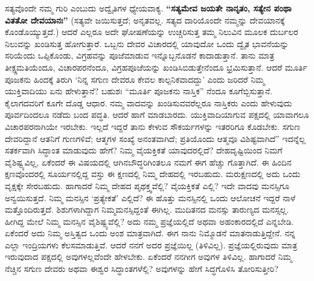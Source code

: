 ಸತ್ಯವೊಂದೇ ನಮ್ಮ ಗುರಿ ಎಂಬುದು ಅದ್ವೈತಿಗಳ ಧ್ಯೇಯವಾಕ್ಯ. \textbf{“ಸತ್ಯಮೇವ ಜಯತೇ ನಾನೃತಂ, ಸತ್ಯೇನ ಪಂಥಾ ವಿತತೋ ದೇವಯಾನಃ”} (ಸತ್ಯವೇ ಜಯಿಸುತ್ತದೆ; ಅನೃತವಲ್ಲ. ಸತ್ಯದ ದಾರಿಯೊಂದೇ ನಮ್ಮನ್ನು ದೇವಯಾನಕ್ಕೆ ಕೊಂಡೊಯ್ಯುತ್ತದೆ.) ಆದರೆ ಎಲ್ಲರೂ ಅದೇ ಘೋಷಣೆಯನ್ನು ಉಚ್ಚರಿಸುತ್ತ ತಮ್ಮ ನಿಲುವಿನ ಮೂಲಕ ದುರ್ಬಲರ ನಿಲುವನ್ನು ಖಂಡಿಸುತ್ತ ಹೋಗುತ್ತಾರೆ. ಒಬ್ಬನು ದೇವರ ವಿಚಾರದಲ್ಲಿ ಯಾವುದೋ ಒಂದು ದ್ವೈತ ಭಾವನೆಯನ್ನು ಸರಿಯೆಂದು ಒಪ್ಪಿಕೊಂಡು, ವಿಗ್ರಹವನ್ನು ಪೂಜೆಮಾಡುವ ಇನ್ನೊಬ್ಬನೊಡನೆ ಕಾದಾಡುತ್ತಾನೆ. ತಾನು ಮಾತ್ರ ತೀಕ್ಷ್ಣಮತಿಯೆಂದೂ, ವಿಚಾರಪರನೆಂದೂ, ವಿಗ್ರಹಪೂಜೆಯನ್ನು ಖಂಡಿಸಿಬಿಡುತ್ತೇನೆಂದೂ ಭ್ರಮಿಸುತ್ತಾನೆ. ಆದರೆ ಮೂರ್ತಿ ಪೂಜಕನು ಹಿಂದಕ್ಕೆ ತಿರುಗಿ ‘ನಿನ್ನ ಸಗುಣ ದೇವರೂ ಕೇವಲ ಕಾಲ್ಪನಿಕವಾದದ್ದು’ ಎಂದು ಜರಿದರೆ ನಿಮ್ಮ ಯುಕ್ತಿವಾದಿಯು ಏನು ಹೇಳುತ್ತಾನೆ? ಬಹುಶಃ “ಮೂರ್ತಿ ಪೂಜಕನು ನಾಸ್ತಿಕ” ನೆಂದೂ ಕೂಗೆಬ್ಬಿಸುತ್ತಾನೆ. ಕೈಲಾಗದವರಿಗೆ ಕೂಗೇ ದೊಡ್ಡ ಆಧಾರ. ನಮ್ಮ ವಾದವನ್ನು ಖಂಡಿಸುವವರೆಲ್ಲರೂ ನಾಸ್ತಿಕರು ಎಂದು ಹೇಳುವುದು ಪೂರ್ವದಿಂದಲೂ ನಡೆದು ಬಂದ ಪದ್ಧತಿ. ಆದರೆ ಹಾಗೆ ಮಾಡಬಾರದು. ಯುಕ್ತಿವಾದಿಯಾಗುವ ಪಕ್ಷದಲ್ಲಿ ಯಾವಾಗಲೂ ವಿಚಾರಪರನಾಗಿಯೇ ಇರಬೇಕು. ಇಲ್ಲದೆ ಇದ್ದರೆ ತಾನು ಕೇಳುವ ಸೌಕರ್ಯಗಳನ್ನು ಇತರರಿಗೂ ಕೊಡಬೇಕು. ಸಗುಣ ದೇವರಿದ್ದಾನೆ ಆತನಿಗೆ ಗುಣಗಳಿವೆ; ಆತ್ಮಗಳ ಸಂಖ್ಯೆ ಅನಂತವಾಗಿದೆ; ಪ್ರತಿಯೊಂದು ಆತ್ಮವೂ ವಿಶಿಷ್ಟವಾಗಿದೆ” ಇದನ್ನೆಲ್ಲ ಸತರ್ಕವಾಗಿ ಸಿದ್ಧಾಂತ ಮಾಡುವುದು ಹೇಗೆ? ನಿಮ್ಮ ವೈಯಕ್ತಿಕತೆ ಯಾವುದರಲ್ಲಿದೆ? ದೇಹ\break ದೃಷ್ಟಿಯಿಂದ ನಿಮಗೆ ವೈಶಿಷ್ಟ್ಯವಿಲ್ಲ, ಏಕೆಂದರೆ ಈ ವಿಷಯದಲ್ಲಿ ಆಗಿನ\break ಬೌದ್ಧರಿಗಿಂತಲೂ ನಮಗೆ ಈಗ ಹೆಚ್ಚು ಗೊತ್ತಾಗಿದೆ. ಈ ಹಿಂದಿನ ಕ್ಷಣವೊಂದರಲ್ಲಿ ಸೂರ್ಯನಲ್ಲಿದ್ದ ವಸ್ತು ಈ ಕ್ಷಣದಲ್ಲಿ ನಿಮ್ಮ ದೇಹದಲ್ಲಿ ಇರಬಹುದು. ಮರುಕ್ಷಣದಲ್ಲಿ ಅದು ಒಂದು ವೃಕ್ಷಕ್ಕೇ ಸೇರಬಹುದು. ಹಾಗಾದರೆ ನಿಮ್ಮ ದೇಹದ ಪೃಥಕ್ತ್ವವೆಲ್ಲಿ? ವೈಯಕ್ತಿಕತೆ ಎಲ್ಲಿ? ಇದೇ ವಾದವು ಮನಸ್ಸಿಗೂ ಅನ್ವಯಿಸುತ್ತದೆ. ನಿಮ್ಮ ಮನಸ್ಸಿನ ‘ಪ್ರತ್ಯೇಕತೆ’ ಎಲ್ಲಿದೆ? ಈ ಹೊತ್ತು ಮನಸ್ಸಿನಲ್ಲಿ ಒಂದು ಆಲೋಚನೆ ಇದ್ದರೆ ನಾಳೆ ಮತ್ತೊಂದಿರುತ್ತದೆ. ಶಿಶುಗಳಾಗಿದ್ದಾಗ ನಿಮ್ಮ\break ಮನಸ್ಸಿದ್ದಂತೆ ಈಗಿಲ್ಲ. ಮುದಿತನದ ಮನಸ್ಸು ತಾರುಣ್ಯದ ಮನಸ್ಸಲ್ಲ. ಹೀಗಿದ್ದ ಮೇಲೆ ನಿಮ್ಮ ಮನಸ್ಸಿನ ವೈಶಿಷ್ಟ್ಯವೆಲ್ಲಿ? ಅದು ನಮ್ಮ ಪ್ರಜ್ಞೆಯಲ್ಲಿದೆ ಅಥವಾ ಅಹಂಕಾರದಲ್ಲಿದೆ ಎನ್ನಬೇಡಿ. ಏಕೆಂದರೆ ಅದು ನಿಮ್ಮ ಅಸ್ತಿತ್ವದ ಒಂದು ಅಂಶ ಮಾತ್ರವಾಗಿದೆ. ಈಗ ನಾನು ನಿಮ್ಮೊಡನೆ ಮಾತನಾಡುತ್ತಿದ್ದೇನೆ. ನನ್ನ ಎಲ್ಲಾ ಇಂದ್ರಿಯಗಳು ಕೆಲಸಮಾಡುತ್ತಿವೆ. ಆದರೆ ನನಗೆ ಅದರ ಪ್ರಜ್ಞೆಯಿಲ್ಲ (ತಿಳಿವಿಲ್ಲ). ಪ್ರಜ್ಞೆಯಲ್ಲಿರುವುದು ಮಾತ್ರ ಇರುವುದಾದ ಪಕ್ಷದಲ್ಲಿ ಅವುಗಳಲ್ಲವೆಂದೇ ಹೇಳಬೇಕು. ಏಕೆಂದರೆ ನನಗೀಗ ಅವುಗಳ ತಿಳಿವಿಲ್ಲ. ಹಾಗಾದರೆ ನಿಮ್ಮ ನೆಚ್ಚಿನ ಸಗುಣ ದೇವರು ಅಥವಾ ಈಶ್ವರ ಸಿದ್ಧಾಂತಗಳೆಲ್ಲಿ? ಅವುಗಳನ್ನು ಹೇಗೆ ಸಿದ್ಧಗೊಳಿಸಿ ತೋರಿಸುತ್ತೀರಿ?

